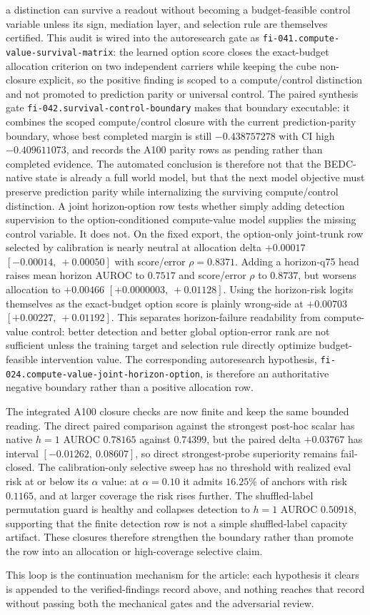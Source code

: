 a distinction can survive a readout without becoming a budget-feasible control
variable unless its sign, mediation layer, and selection rule are themselves
certified.
This audit is wired into the autoresearch gate as
\texttt{fi-041.compute-value-survival-matrix}: the learned option score closes
the exact-budget allocation criterion on two independent carriers while keeping
the cube non-closure explicit, so the positive finding is scoped to a
compute/control distinction and not promoted to prediction parity or universal
control.
The paired synthesis gate \texttt{fi-042.survival-control-boundary} makes that
boundary executable: it combines the scoped compute/control closure with the
current prediction-parity boundary, whose best completed margin is still
$-0.438757278$ with CI high $-0.409611073$, and records the A100 parity rows as
pending rather than completed evidence.  The automated conclusion is therefore
not that the BEDC-native state is already a full world model, but that the next
model objective must preserve prediction parity while internalizing the
surviving compute/control distinction.
A joint horizon-option row tests whether simply adding detection supervision to
the option-conditioned compute-value model supplies the missing control
variable.  It does not.  On the fixed export, the option-only joint-trunk row
selected by calibration is nearly neutral at allocation delta $+0.00017$
$[-0.00014,\ +0.00050]$ with score/error $\rho=0.8371$.  Adding a horizon-q75
head raises mean horizon AUROC to $0.7517$ and score/error $\rho$ to $0.8737$,
but worsens allocation to $+0.00466$ $[+0.0000003,\ +0.01128]$.  Using the
horizon-risk logits themselves as the exact-budget option score is plainly
wrong-side at $+0.00703$ $[+0.00227,\ +0.01192]$.  This separates
horizon-failure readability from compute-value control: better detection and
better global option-error rank are not sufficient unless the training target
and selection rule directly optimize budget-feasible intervention value.  The
corresponding autoresearch hypothesis,
\texttt{fi-024.compute-value-joint-horizon-option}, is therefore an
authoritative negative boundary rather than a positive allocation row.

The integrated A100 closure checks are now finite and keep the same bounded
reading.  The direct paired comparison against the strongest post-hoc scalar
has native $h=1$ AUROC $0.78165$ against $0.74399$, but the paired delta
$+0.03767$ has interval $[-0.01262,\ 0.08607]$, so direct strongest-probe
superiority remains fail-closed.  The calibration-only selective sweep has no
threshold with realized eval risk at or below its $\alpha$ value: at
$\alpha=0.10$ it admits $16.25\%$ of anchors with risk $0.1165$, and at larger
coverage the risk rises further.  The shuffled-label permutation guard is
healthy and collapses detection to $h=1$ AUROC $0.50918$, supporting that the
finite detection row is not a simple shuffled-label capacity artifact.  These
closures therefore strengthen the boundary rather than promote the row into an
allocation or high-coverage selective claim.

This loop is the continuation mechanism for the article: each hypothesis it
clears is appended to the verified-findings record above, and nothing reaches
that record without passing both the mechanical gates and the adversarial
review.
